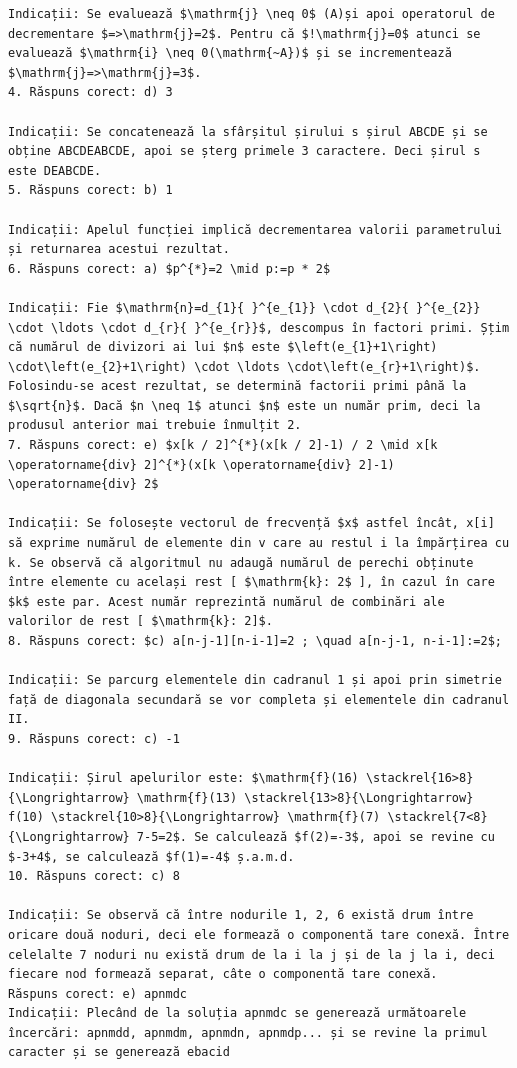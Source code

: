 \documentclass[10pt]{article}
\begin{document}
\begin{verbatim}
Indicații: Se evaluează $\mathrm{j} \neq 0$ (A)și apoi operatorul de decrementare $=>\mathrm{j}=2$. Pentru că $!\mathrm{j}=0$ atunci se evaluează $\mathrm{i} \neq 0(\mathrm{~A})$ și se incrementează $\mathrm{j}=>\mathrm{j}=3$.
4. Răspuns corect: d) 3

Indicații: Se concatenează la sfârșitul șirului s șirul ABCDE și se obține ABCDEABCDE, apoi se șterg primele 3 caractere. Deci șirul s este DEABCDE.
5. Răspuns corect: b) 1

Indicații: Apelul funcției implică decrementarea valorii parametrului și returnarea acestui rezultat.
6. Răspuns corect: a) $p^{*}=2 \mid p:=p * 2$

Indicații: Fie $\mathrm{n}=d_{1}{ }^{e_{1}} \cdot d_{2}{ }^{e_{2}} \cdot \ldots \cdot d_{r}{ }^{e_{r}}$, descompus în factori primi. Ș̦tim că numărul de divizori ai lui $n$ este $\left(e_{1}+1\right) \cdot\left(e_{2}+1\right) \cdot \ldots \cdot\left(e_{r}+1\right)$. Folosindu-se acest rezultat, se determină factorii primi până la $\sqrt{n}$. Dacă $n \neq 1$ atunci $n$ este un număr prim, deci la produsul anterior mai trebuie înmulțit 2.
7. Răspuns corect: e) $x[k / 2]^{*}(x[k / 2]-1) / 2 \mid x[k \operatorname{div} 2]^{*}(x[k \operatorname{div} 2]-1) \operatorname{div} 2$

Indicații: Se folosește vectorul de frecvență $x$ astfel încât, x[i] să exprime numărul de elemente din v care au restul i la împărțirea cu k. Se observă că algoritmul nu adaugă numărul de perechi obținute între elemente cu același rest [ $\mathrm{k}: 2$ ], în cazul în care $k$ este par. Acest număr reprezintă numărul de combinări ale valorilor de rest [ $\mathrm{k}: 2]$.
8. Răspuns corect: $c) a[n-j-1][n-i-1]=2 ; \quad a[n-j-1, n-i-1]:=2$;

Indicații: Se parcurg elementele din cadranul 1 și apoi prin simetrie față de diagonala secundară se vor completa și elementele din cadranul II.
9. Răspuns corect: c) -1

Indicații: Șirul apelurilor este: $\mathrm{f}(16) \stackrel{16>8}{\Longrightarrow} \mathrm{f}(13) \stackrel{13>8}{\Longrightarrow} f(10) \stackrel{10>8}{\Longrightarrow} \mathrm{f}(7) \stackrel{7<8}{\Longrightarrow} 7-5=2$. Se calculează $f(2)=-3$, apoi se revine cu $-3+4$, se calculează $f(1)=-4$ ș.a.m.d.
10. Răspuns corect: c) 8

Indicații: Se observă că între nodurile 1, 2, 6 există drum între oricare două noduri, deci ele formează o componentă tare conexă. Între celelalte 7 noduri nu există drum de la i la j și de la j la i, deci fiecare nod formează separat, câte o componentă tare conexă.
Răspuns corect: e) apnmdc
Indicații: Plecând de la soluția apnmdc se generează următoarele încercări: apnmdd, apnmdm, apnmdn, apnmdp... și se revine la primul caracter și se generează ebacid


\end{verbatim}
\end{document}
